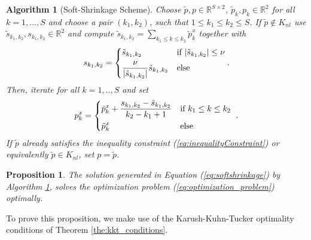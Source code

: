 \documentclass[abstracton]{scrreprt}
\newtheorem{proposition}[theorem]{Proposition}
\newtheorem{algorithm}[theorem]{Algorithm}
\begin{document}
            \begin{algorithm}[Soft-Shrinkage Scheme]
            \label{alg:softshrinkage}
                Choose $\tilde{p}, p \in \mathbb{R}^{S \times 2}$, $\tilde{p}_{k}, p_{k} \in \mathbb{R}^{2}$ for all $k = 1, ..., S$ and choose a pair $(k_{1}, k_{2})$, such that $1 \le k_{1} \le k_{2} \le S$. If $\tilde{p} \notin K_{nl}$ use $\tilde{s}_{k_{1}, k_{2}}, s_{k_{1}, k_{2}} \in \mathbb{R}^{2}$ and compute $\tilde{s}_{k_{1}, k_{2}} = \sum_{k_{1} \le k \le k_{2}} \tilde{p}^{x}_{k}$ together with
                    $$
                        s_{k_{1}, k_{2}} =
                            \begin{dcases*}
                                \tilde{s}_{k_{1}, k_{2}} & \textnormal{if $|\tilde{s}_{k_{1}, k_{2}}| \le \nu$}\\
                                \frac{\nu}{|\tilde{s}_{k_{1}, k_{2}}|} \tilde{s}_{k_{1}, k_{2}} & \textnormal{else}
                            \end{dcases*}.
                    $$
                Then, iterate for all $k = 1, .., S$ and set
                    \begin{equation}
                        p^{x}_{k} =
                            \begin{dcases*}
                                \tilde{p}^{x}_{k} + \frac{s_{k_{1}, k_{2}} - \tilde{s}_{k_{1}, k_{2}}}{k_{2} - k_{1} + 1} & \textnormal{if $k_{1} \le k \le k_{2}$} \\
                                \tilde{p}^{x}_{k} & \textnormal{else}
                            \end{dcases*}.
                        \label{eq:softshrinkage}
                    \end{equation}
                If $\tilde{p}$ already satisfies the inequality constraint (\ref{eq:inequalityConstraint}) or equivalently $\tilde{p} \in K_{nl}$, set $p = \tilde{p}$.
            \end{algorithm}
            \begin{proposition}
                \label{prop:softshrinkage}
                The solution generated in Equation (\ref{eq:softshrinkage}) by Algorithm \ref{alg:softshrinkage}, solves the optimization problem (\ref{eq:optimization_problem}) optimally.
            \end{proposition}
            To prove this proposition, we make use of the Karush-Kuhn-Tucker optimality conditions of Theorem \ref{the:kkt_conditions}.
\end{document}
